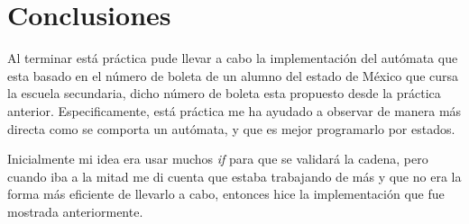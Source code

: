 \documentclass[12pt]{article}
\begin{document}
	\newpage
	\section{Conclusiones}

	Al terminar está práctica pude llevar a cabo la implementación del autómata que 
	esta basado en el número de boleta de un alumno del estado de México que cursa
	la escuela secundaria, dicho número de boleta esta propuesto desde la práctica 
	anterior. Especificamente, está práctica me ha ayudado a observar de manera más 
	directa como se comporta un autómata, y que es mejor programarlo por estados.

	Inicialmente mi idea era usar muchos \textsl{if} para que se validará la cadena,
	pero cuando iba a la mitad me di cuenta que estaba trabajando de más y que no 
	era la forma más eficiente de llevarlo a cabo, entonces hice la implementación
	que fue mostrada anteriormente. 
\end{document}
